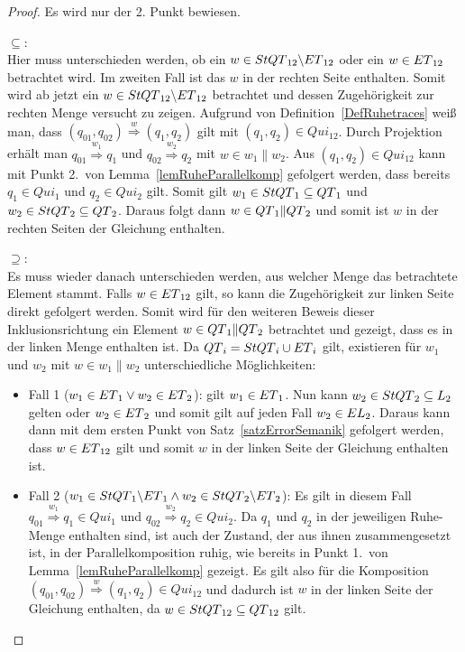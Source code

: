 \begin{proof}
  Es wird nur der 2. Punkt bewiesen.

  \glqq $\subseteq$\grqq :\\
  Hier muss unterschieden werden, ob ein $w\in StQT{}_{12}\backslash ET{}_{12}$
  oder ein $w\in ET{}_{12}$ betrachtet wird. Im zweiten Fall ist das
  $w$ in der rechten Seite enthalten. Somit wird ab jetzt ein $w\in
  StQT{}_{12}\backslash ET{}_{12}$ betrachtet und dessen Zugehörigkeit zur
  rechten Menge versucht zu zeigen. Aufgrund von
  Definition~\ref{DefRuhetraces} weiß man, dass $(q_{01},q_{02})
  \overset{w}{\Rightarrow} (q_1,q_2)$ gilt mit $(q_1,q_2)\in Qui_{12}$. Durch
  Projektion erhält man $q_{01} \overset{w_1}{\Rightarrow} q_1$ und $q_{02}
  \overset{w_2}{\Rightarrow} q_2$ mit $w\in w_1\|w_2$. Aus $(q_1,q_2)\in
  Qui_{12}$ kann mit Punkt 2.\ von Lemma~\ref{lemRuheParallelkomp} gefolgert
  werden, dass bereits $q_1\in Qui_1$ und $q_2\in Qui_2$ gilt. Somit gilt
  $w_1\in StQT{}_1\subseteq QT{}_1$ und $w_2\in StQT{}_2\subseteq QT{}_2$.
  Daraus folgt dann $w\in QT{}_1\|QT{}_2$ und somit ist $w$ in der rechten
  Seiten der Gleichung enthalten.

  \glqq $\supseteq$\grqq :\\
  Es muss wieder danach unterschieden werden, aus welcher Menge das betrachtete
  Element stammt. Falls $w\in ET{}_{12}$ gilt, so kann die
  Zugehörigkeit zur linken Seite direkt gefolgert werden. Somit wird für den
  weiteren Beweis dieser Inklusionsrichtung ein Element $w\in QT{}_1\|QT{}_2$
  betrachtet und gezeigt, dass es in der linken Menge enthalten ist. Da
  $QT{}_i = StQT{}_i\cup ET{}_i$ gilt, existieren für $w_1$ und $w_2$ mit
  $w\in w_1\| w_2$ unterschiedliche Möglichkeiten:
  \begin{itemize}
    \item Fall 1 ($w_1\in ET{}_1\vee w_2\in ET{}_2$): \OBdA{} gilt
      $w_1\in ET{}_1$. Nun kann $w_2\in StQT{}_2\subseteq L_2$ gelten
      oder $w_2\in ET{}_2$ und somit gilt auf jeden Fall $w_2\in
      EL{}_2$. Daraus kann dann mit dem ersten Punkt von
      Satz~\ref{satzErrorSemanik} gefolgert werden, dass $w\in ET{}_{12}$ gilt
      und somit $w$ in der linken Seite der Gleichung enthalten ist.
    \item Fall 2 ($w_1\in StQT{}_1\backslash ET{}_1\wedge w_2\in
      StQT{}_2\backslash ET{}_2$): Es gilt in diesem Fall $q_{01}
      \overset{w_1}{\Rightarrow} q_1\in Qui_1$ und $q_{02}
      \overset{w_2}{\Rightarrow} q_2\in Qui_2$. Da $q_1$ und $q_2$ in der
      jeweiligen Ruhe-Menge enthalten sind, ist auch der Zustand, der aus ihnen
      zusammengesetzt ist, in der Parallelkomposition ruhig, wie bereits in Punkt 1.\ von
      Lemma~\ref{lemRuheParallelkomp} gezeigt. Es gilt also für die Komposition
      $(q_{01},q_{02}) \overset{w}{\Rightarrow} (q_1,q_2)\in Qui_{12}$ und
      dadurch ist $w$ in der linken Seite der Gleichung enthalten, da $w\in
      StQT{}_{12}\subseteq QT{}_{12}$ gilt.
  \end{itemize}
\end{proof}


